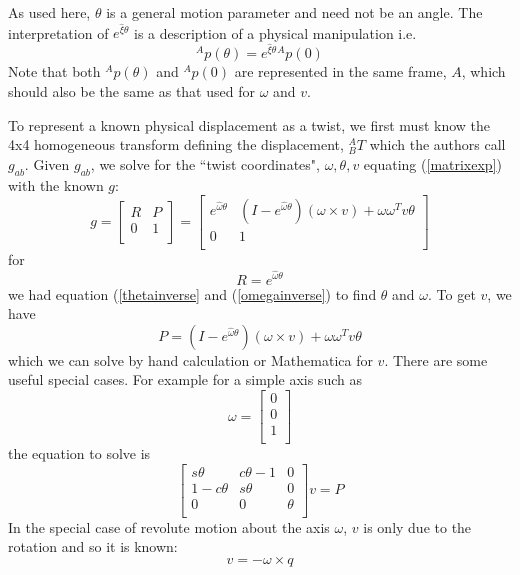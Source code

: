 As used here, $\theta$ is a general motion parameter and need not be an angle.
The interpretation of $e^{\hat{\xi}\theta}$ is a description of a physical manipulation
i.e.
\[
^Ap(\theta) = {e^{\hat{\xi}\theta}}    {^Ap(0)}
\]
Note that both $^Ap(\theta)$ and $^Ap(0)$ are represented in the same frame, $A$, which
should also be the same as that used for $\omega$ and $v$.

To represent a known physical displacement as a twist, we first must know the 4x4 homogeneous
transform defining the displacement, $^A_BT$ which the authors call $g_{ab}$.
Given $g_{ab}$, we solve for the ``twist coordinates", $\omega, \theta, v$ equating
(\ref{matrixexp}) with the known $g$:
\[
g = \left [
        \begin{array}{cc}
        R               &               P       \\
        0               &               1       \\
        \end{array}
\right]
=
\left[
        \begin{array}{cc}
  e^{\hat{\omega}\theta}   & (I-e^{\hat{\omega}\theta})(\omega\times v) + \omega\omega^Tv\theta          \\
  0                        &       1                               \\
        \end{array}
\right]
\]
for
\[
R = e^{\hat{\omega}\theta}
\]
we had equation (\ref{thetainverse} and (\ref{omegainverse}) to find $\theta$ and $\omega$.
To get $v$, we have
\[
P = (I-e^{\hat{\omega}\theta})(\omega\times v) + \omega\omega^Tv\theta
\]
which we can solve by hand calculation or Mathematica for $v$.  There are some useful special
cases. For example for a simple axis such as
\[
\omega = \left [
        \begin{array}{c}
        0\\0\\1\\
        \end{array}
        \right ]
\]
the equation to solve is
\[
\left[
        \begin{array}{ccc}
        s\theta &       c\theta -1      &       0\\
        1-c\theta   &   s\theta         &       0\\
        0              &        0       &   \theta\\
        \end{array}
\right]
v = P
\]
In the special case of revolute motion about the axis $\omega$, $v$ is only due to the
rotation and so it is known:
\[
v = -\omega \times q
\]

